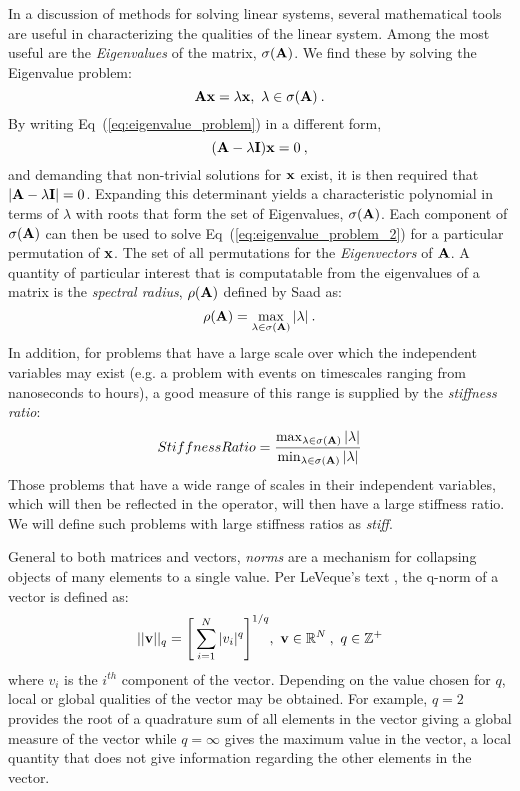 In a discussion of methods for solving linear systems, several
mathematical tools are useful in characterizing the qualities of the
linear system. Among the most useful are the \textit{Eigenvalues} of
the matrix, $\sigma(\mathbf{A})$. We find these by solving the Eigenvalue
problem:
\begin{equation}
  \mathbf{A} \mathbf{x} = \lambda \mathbf{x},\ \lambda \in \sigma(\mathbf{A})\:.
  \label{eq:eigenvalue_problem}
\end{equation}
By writing Eq~(\ref{eq:eigenvalue_problem}) in a different form,
\begin{equation}
  (\mathbf{A} - \lambda \mathbf{I})\mathbf{x} = 0 \:,
  \label{eq:eigenvalue_problem_2}
\end{equation}
and demanding that non-trivial solutions for $\mathbf{x}$ exist, it is
then required that $|\mathbf{A} - \lambda \mathbf{I}| = 0$. Expanding this
determinant yields a characteristic polynomial in terms of $\lambda$
with roots that form the set of Eigenvalues, $\sigma(\mathbf{A})$. Each
component of $\sigma(\mathbf{A})$ can then be used to solve
Eq~(\ref{eq:eigenvalue_problem_2}) for a particular permutation of
$\mathbf{x}$. The set of all permutations for the \textit{Eigenvectors} of
$\mathbf{A}$. A quantity of particular interest that is computatable from
the eigenvalues of a matrix is the \textit{spectral radius},
$\rho(\mathbf{A})$ defined by Saad \citep{saad_2003} as:
\begin{equation}
  \rho(\mathbf{A}) = \max_{\lambda \in \sigma(\mathbf{A})} |\lambda| \:.
  \label{eq:spectral_radius}
\end{equation}
In addition, for problems that have a large scale over which the
independent variables may exist (e.g. a problem with events on
timescales ranging from nanoseconds to hours), a good measure of this
range is supplied by the \textit{stiffness ratio}:
\begin{equation}
  Stiffness Ratio = \frac{\max_{\lambda \in \sigma(\mathbf{A})}
    |\lambda|}{\min_{\lambda \in \sigma(\mathbf{A})} |\lambda|}
\end{equation}
Those problems that have a wide range of scales in their independent
variables, which will then be reflected in the operator, will then
have a large stiffness ratio. We will define such problems with large
stiffness ratios as \textit{stiff}.

General to both matrices and vectors, \textit{norms} are a mechanism
for collapsing objects of many elements to a single value. Per
LeVeque's text \citep{leveque_2007}, the q-norm of a vector is defined
as:
\begin{equation}
  ||\mathbf{v}||_q = \Bigg[ \sum_{i=1}^N |v_i|^q \Bigg]^{1/q},\ \mathbf{v} \in
  \mathbb{R}^N\:,\ q \in \mathbb{Z}^+
  \label{eq:q_norm}
\end{equation}
where ${v_i}$ is the $i^{th}$ component of the vector. Depending on
the value chosen for $q$, local or global qualities of the vector may
be obtained. For example, $q=2$ provides the root of a quadrature sum
of all elements in the vector giving a global measure of the vector
while $q=\infty$ gives the maximum value in the vector, a local
quantity that does not give information regarding the other elements
in the vector.

